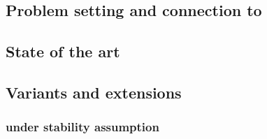 \subsection{Problem setting and connection to \esp{}}
\label{sub:problem_setting}


\subsection{State of the art}
\label{sub:state_of_the_art}



\subsection{Variants and extensions}
\label{sub:variants_and_extensions}


\subsubsection{\pcc{} under stability assumption}
\label{ssub:cc_under_stability_assumption}

